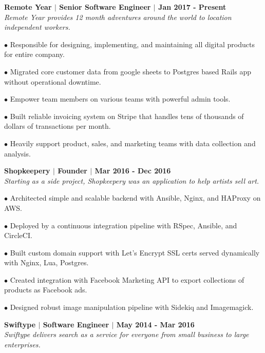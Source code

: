 \documentclass{article}
\begin{document}
	\begin{description}
	
	\item \textbf{Remote Year $|$ Senior Software Engineer $|$ Jan 2017 - Present} \\
	 \textit{Remote Year provides 12 month adventures around the world to location independent workers.}
	 \item$\bullet$ Responsible for designing, implementing, and maintaining all digital products for entire company.
	 \item$\bullet$ Migrated core customer data from google sheets to Postgres based Rails app without operational downtime.
	 \item$\bullet$ Empower team members on various teams with powerful admin tools.
	 \item$\bullet$ Built reliable invoicing system on Stripe that handles tens of thousands of dollars of transactions per month.
	 \item$\bullet$ Heavily support product, sales, and marketing teams with data collection and analysis.
	
	 \item \textbf{Shopkeepery $|$ Founder $|$ Mar 2016 - Dec 2016} \\
	 \textit{Starting as a side project, Shopkeepery was an application to help artists sell art.}
	 
	 \item$\bullet$ Architected simple and scalable backend with Ansible, Nginx, and HAProxy on AWS.
	 
	 \item$\bullet$ Deployed by a continuous integration pipeline with RSpec, Ansible, and CircleCI.
	 \item$\bullet$ Built custom domain support with Let’s Encrypt SSL certs served dynamically with Nginx, Lua, Postgres.
	 \item$\bullet$ Created integration with Facebook Marketing API to export collections of products as Facebook ads.
	 \item$\bullet$ Designed robust image manipulation pipeline with Sidekiq and Imagemagick.
	
	 \item \textbf{Swiftype $|$ Software Engineer $|$ May 2014 - Mar 2016} \\
	 \textit{Swiftype delivers search as a service for everyone from small business to large enterprises.}
	 

\end{description}
\end{document}
